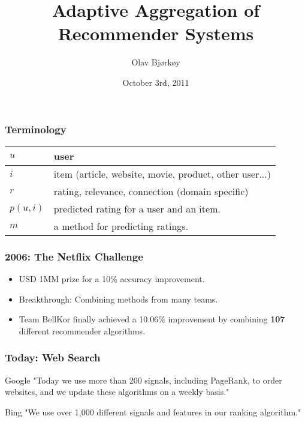 \documentclass[screen]{beamer}
\title[Adaptive Aggregation of Recommender Systems]%
{Adaptive Aggregation of\\Recommender Systems}
\author{Olav Bj{\o}rk{\o}y}
\institute[NTNU]{Department of Computer and Information Science}
\date{October 3rd, 2011}
\begin{document}
\ntnutitlepage


\begin{frame}
  \frametitle{Terminology}
  \begin{tabular*}{0.9\textwidth}{ l l }
    \hline
    $u$ & user \\
    \hline
    $i$ & item (article, website, movie, product, other user...)\\
    \hline
    $r$ & rating, relevance, connection (domain specific)\\
    \hline
    $p(u,i)$ & predicted rating for a user and an item.\\
    \hline
    $m$ & a method for predicting ratings.\\
    \hline
  \end{tabular*}
\end{frame}

\begin{frame}
  \frametitle{2006: The Netflix Challenge}
    \begin{itemize}
      \item USD 1MM prize for a 10\% accuracy improvement.\\
      \item Breakthrough: Combining methods from many teams.\\
      \item Team BellKor finally achieved a 10.06\% improvement by combining \textbf{107} different recommender algorithms.
    \end{itemize}
\end{frame}

\begin{frame}
  \frametitle{Today: Web Search}
    \begin{block}{Google}
      "Today we use more than 200 signals, including PageRank, to order websites, and we update these algorithms on a weekly basis."
    \end{block}
    \begin{block}{Bing}
      "We use over 1,000 different signals and features in our ranking algorithm."
    \end{block}
\end{frame}
\end{document}
